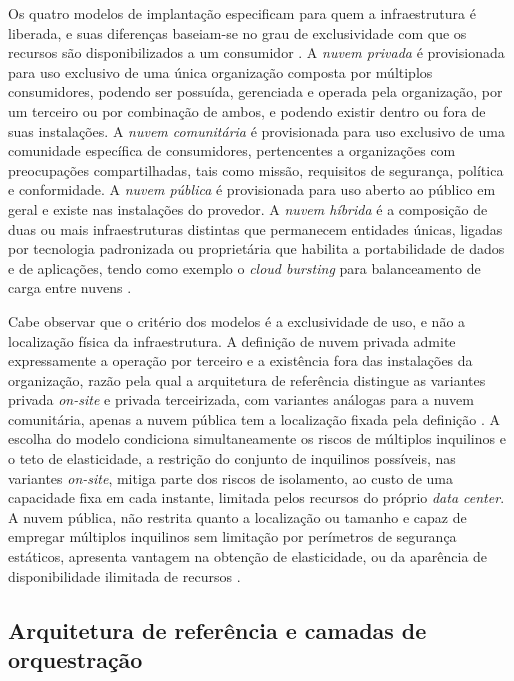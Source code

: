 Os quatro modelos de implantação especificam para quem a infraestrutura é liberada, e suas diferenças baseiam-se no grau de exclusividade com que os recursos são disponibilizados a um consumidor \cite{liu2011nist}. A \emph{nuvem privada} é provisionada para uso exclusivo de uma única organização composta por múltiplos consumidores, podendo ser possuída, gerenciada e operada pela organização, por um terceiro ou por combinação de ambos, e podendo existir dentro ou fora de suas instalações. A \emph{nuvem comunitária} é provisionada para uso exclusivo de uma comunidade específica de consumidores, pertencentes a organizações com preocupações compartilhadas, tais como missão, requisitos de segurança, política e conformidade. A \emph{nuvem pública} é provisionada para uso aberto ao público em geral e existe nas instalações do provedor. A \emph{nuvem híbrida} é a composição de duas ou mais infraestruturas distintas que permanecem entidades únicas, ligadas por tecnologia padronizada ou proprietária que habilita a portabilidade de dados e de aplicações, tendo como exemplo o \emph{cloud bursting} para balanceamento de carga entre nuvens \cite{mell2011nist}.

Cabe observar que o critério dos modelos é a exclusividade de uso, e não a localização física da infraestrutura. A definição de nuvem privada admite expressamente a operação por terceiro e a existência fora das instalações da organização, razão pela qual a arquitetura de referência distingue as variantes privada \emph{on-site} e privada terceirizada, com variantes análogas para a nuvem comunitária, apenas a nuvem pública tem a localização fixada pela definição \cite{liu2011nist}. A escolha do modelo condiciona simultaneamente os riscos de múltiplos inquilinos e o teto de elasticidade, a restrição do conjunto de inquilinos possíveis, nas variantes \emph{on-site}, mitiga parte dos riscos de isolamento, ao custo de uma capacidade fixa em cada instante, limitada pelos recursos do próprio \emph{data center}. A nuvem pública, não restrita quanto a localização ou tamanho e capaz de empregar múltiplos inquilinos sem limitação por perímetros de segurança estáticos, apresenta vantagem na obtenção de elasticidade, ou da aparência de disponibilidade ilimitada de recursos \cite{badger2012cloud}.

\subsection{Arquitetura de referência e camadas de orquestração}

